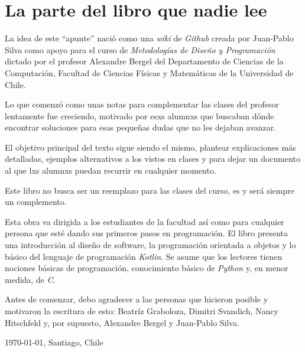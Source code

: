 \chapter*{La parte del libro que nadie lee}
  La idea de este \enquote{apunte} nació como una \textit{wiki} de \textit{Github} creada por 
  Juan-Pablo Silva como apoyo para el curso de \textit{Metodologías de Diseño y Programación} 
  dictado por el profesor Alexandre Bergel del Departamento de Ciencias de la Computación, Facultad
  de Ciencias Físicas y Matemáticas de la Universidad de Chile.

  Lo que comenzó como unas notas para complementar las clases del profesor lentamente fue creciendo,
  motivado por esxs alumnxs que buscaban dónde encontrar soluciones para esas pequeñas dudas que no
  les dejaban avanzar.

  El objetivo principal del texto sigue siendo el mismo, plantear explicaciones más detalladas, 
  ejemplos alternativos a los vistos en clases y para dejar un documento al que lxs alumnxs puedan
  recurrir en cualquier momento.

  Este libro no busca ser un reemplazo para las clases del curso, es y será siempre un complemento.

  Esta obra va dirigida a los estudiantes de la facultad así como para cualquier persona que esté
  dando sus primeros pasos en programación.
  El libro presenta una introducción al diseño de software, la programación orientada a objetos y lo
  básico del lenguaje de programación \textit{Kotlin}.
  Se asume que los lectores tienen nociones básicas de programación, conocimiento básico de 
  \textit{Python} y, en menor medida, de \textit{C}.

  Antes de comenzar, debo agradecer a las personas que hicieron posible y motivaron la escritura de
  esto: Beatríz Graboloza, Dimitri Svandich, Nancy Hitschfeld y, por supuesto, Alexandre Bergel y 
  Juan-Pablo Silva.

  \begin{center}
    \today, Santiago, Chile
  \end{center}